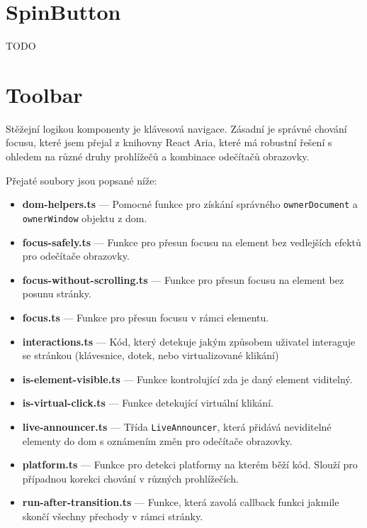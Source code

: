 \section{SpinButton}

TODO

\clearpage

\section{Toolbar}

Stěžejní logikou komponenty  je klávesová navigace.
Zásadní je správné chování focusu, které jsem přejal z knihovny React Aria, které má robustní řešení s ohledem na různé druhy prohlížečů a kombinace odečítačů obrazovky.

Přejaté soubory jsou popsané níže:

\begin{itemize}
    \item \textbf{dom-helpers.ts} --- Pomocné funkce pro získání správného \texttt{ownerDocument} a \texttt{ownerWindow} objektu z \gls{dom}.
    \item \textbf{focus-safely.ts} --- Funkce pro přesun focusu na element bez vedlejších efektů pro odečítače obrazovky.
    \item \textbf{focus-without-scrolling.ts} --- Funkce pro přesun focusu na element bez posunu stránky.
    \item \textbf{focus.ts} --- Funkce pro přesun focusu v rámci elementu.
    \item \textbf{interactions.ts} --- Kód, který detekuje jakým způsobem uživatel interaguje se stránkou (klávesnice, dotek, nebo virtualizované klikání)
    \item \textbf{is-element-visible.ts} --- Funkce kontrolující zda je daný element viditelný.
    \item \textbf{is-virtual-click.ts} --- Funkce detekující virtuální klikání.
    \item \textbf{live-announcer.ts} --- Třída \texttt{LiveAnnouncer}, která přidává neviditelné elementy do \gls{dom} s oznámením změn pro odečítače obrazovky.
    \item \textbf{platform.ts} --- Funkce pro detekci platformy na kterém běží kód. Slouží pro případnou korekci chování v různých prohlížečích.
    \item \textbf{run-after-transition.ts} --- Funkce, která zavolá callback funkci jakmile skončí všechny přechody v rámci stránky.
\end{itemize}

